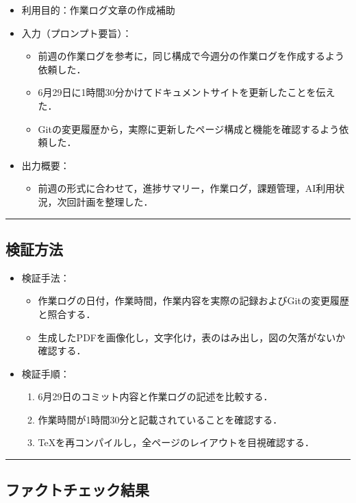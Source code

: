\documentclass[uplatex,dvipdfmx,a4paper,11pt]{jsarticle}
\newcommand{\sectionrule}{\par\medskip\noindent\rule{\linewidth}{0.6pt}\par\medskip}
\begin{document}
\begin{itemize}
  \item 利用目的：作業ログ文章の作成補助
  \item 入力（プロンプト要旨）：
    \begin{itemize}
      \item 前週の作業ログを参考に，同じ構成で今週分の作業ログを作成するよう依頼した．
      \item 6月29日に1時間30分かけてドキュメントサイトを更新したことを伝えた．
      \item Gitの変更履歴から，実際に更新したページ構成と機能を確認するよう依頼した．
    \end{itemize}
  \item 出力概要：
    \begin{itemize}
      \item 前週の形式に合わせて，進捗サマリー，作業ログ，課題管理，AI利用状況，次回計画を整理した．
    \end{itemize}
\end{itemize}

\sectionrule

\subsection{検証方法}

\begin{itemize}
  \item 検証手法：
    \begin{itemize}
      \item 作業ログの日付，作業時間，作業内容を実際の記録およびGitの変更履歴と照合する．
      \item 生成したPDFを画像化し，文字化け，表のはみ出し，図の欠落がないか確認する．
    \end{itemize}
  \item 検証手順：
    \begin{enumerate}
      \item 6月29日のコミット内容と作業ログの記述を比較する．
      \item 作業時間が1時間30分と記載されていることを確認する．
      \item TeXを再コンパイルし，全ページのレイアウトを目視確認する．
    \end{enumerate}
\end{itemize}

\sectionrule

\subsection{ファクトチェック結果}
\end{document}
